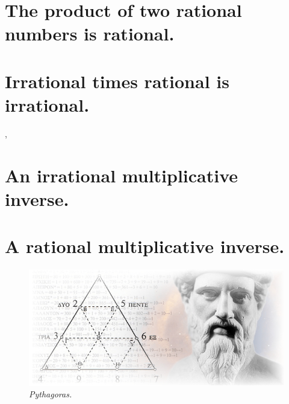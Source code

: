 \documentclass[preview]{standalone}
\begin{document}
\section{The product of two rational numbers is rational.}

\pagebreak


\section{Irrational times rational is irrational.}

\sep


\section{An irrational multiplicative inverse.}

\pagebreak


\section{A rational multiplicative inverse.}

\begin{figure}[h!]
    \centering
    \includegraphics[width=13cm]{../resources/jpg/1.6.introduction.to.proofs/pythagoras.jpg}
    \caption*{\emph{Pythagoras.}}
\end{figure}


\end{document}
